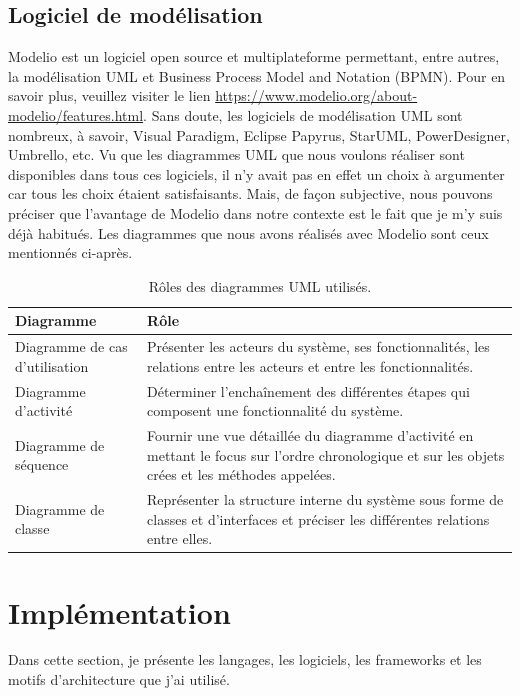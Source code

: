 \subsection{Logiciel de modélisation}
Modelio est un logiciel open source et multiplateforme permettant, entre autres, la modélisation UML et Business Process Model and Notation (BPMN). Pour en savoir plus, veuillez visiter le lien \href{https://www.modelio.org/about-modelio/features.html}{https://www.modelio.org/about-modelio/features.html}.
\newline
Sans doute, les logiciels de modélisation UML sont nombreux, à savoir, Visual Paradigm, Eclipse Papyrus, StarUML, PowerDesigner, Umbrello, etc. Vu que les diagrammes UML que nous voulons réaliser sont disponibles dans tous ces logiciels, il n’y avait pas en effet un choix à argumenter car
tous les choix étaient satisfaisants. Mais, de façon subjective, nous pouvons préciser que l’avantage de Modelio dans notre contexte est le fait que je m'y suis	 déjà habitués. Les diagrammes que nous avons réalisés avec Modelio sont ceux mentionnés ci-après.
\newline\newline
\begin{table}[h]
	\begin{tabular}{|m{6cm}|m{10cm}|}
		\hline
		\textbf{Diagramme} & \textbf{Rôle} \\
		\hline
		Diagramme de cas d’utilisation & Présenter les acteurs du système, ses fonctionnalités, les relations entre les acteurs et entre les fonctionnalités. \\
		\hline
		Diagramme d’activité & Déterminer l’enchaînement des différentes étapes qui composent une fonctionnalité du système. \\
		\hline
		Diagramme de séquence & Fournir une vue détaillée du diagramme d’activité en mettant le focus sur l’ordre chronologique et sur les objets crées et les méthodes appelées. \\
		\hline
		Diagramme de classe & Représenter la structure interne du système sous forme de classes et d’interfaces et préciser les différentes relations entre elles. \\
		\hline
		
	\end{tabular}
	\caption{Rôles des diagrammes UML utilisés.}
	\label{3.1}
\end{table}

\section{Implémentation}
Dans cette section, je présente les langages, les logiciels, les frameworks et les motifs d’architecture que j'ai utilisé.


